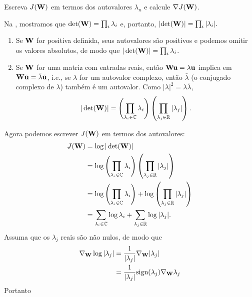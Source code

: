 \begin{exenumerate}
    \item Escreva $J(\mathbf{W})$ em termos dos autovalores $\lambda_n$ e calcule $\nabla J(\mathbf{\mathbf{W}})$.
    \begin{solution}
        Na , mostramos que $\det(\mathbf{W}) = \prod_i \lambda_i$ e, portanto, $|\textrm{det}(\mathbf{W})| = \prod_i |\lambda_i|.$
        \begin{enumerate}
            \item[(i)] Se $\mathbf{W}$ for positiva definida, seus autovalores s\~ao positivos e
            podemos omitir os valores absolutos, de modo que $|\det(\mathbf{W})| = \prod_i \lambda_i$.
            \item[(ii)] Se $\mathbf{W}$ for uma matriz com entradas reais, ent\~ao $\mathbf{W}\mathbf{u} = \lambda\mathbf{u}$
            implica em $\mathbf{W}\bar{\mathbf{u}} = \bar{\lambda}\bar{\mathbf{u}}$, i.e., se $\lambda$ for um
            autovalor complexo, ent\~ao $\bar{\lambda}$ (o conjugado complexo de
            $\lambda$) tamb\'em \'e um autovalor. Como $|\lambda|^2 =
            \lambda\bar{\lambda}$,
            \begin{align}
                |\det(\mathbf{W})| = \left(\prod_{\lambda_i \in \mathbb{C}} \lambda_i \right) \left(\prod_{\lambda_j \in \mathbb{R}} |\lambda_j| \right).
            \end{align}
        \end{enumerate}
        Agora podemos escrever $J(\mathbf{W})$ em termos dos autovalores:
        \begin{align}
            J(\mathbf{W})  &= \log |\det(\mathbf{W})| \\
            &= \log\left(\prod_{\lambda_i \in \mathbb{C}} \lambda_i \right) \left(\prod_{\lambda_j \in \mathbb{R}} |\lambda_j|\right) \\
            &= \log\left(\prod_{\lambda_i \in \mathbb{C}} \lambda_i \right) + \log\left(\prod_{\lambda_j \in \mathbb{R}} |\lambda_j| \right) \\
            &= \sum_{\lambda_i \in \mathbb{C}} \log \lambda_i + \sum_{\lambda_j \in \mathbb{R}} \log |\lambda_j|.
        \end{align}
        Assuma que os $\lambda_j$ reais s\~ao n\~ao nulos, de modo que
        \begin{align}
            \nabla_{\mathbf{W}} \log |\lambda_j| & = \frac{1}{|\lambda_j|} \nabla_{\mathbf{W}} |\lambda_j|\\
            & =  \frac{1}{|\lambda_j|} \textrm{sign}(\lambda_j)\nabla_{\mathbf{W}}\lambda_j
        \end{align}
        Portanto
        \begin{align}

\end{align}
\end{solution}
\end{exenumerate}
